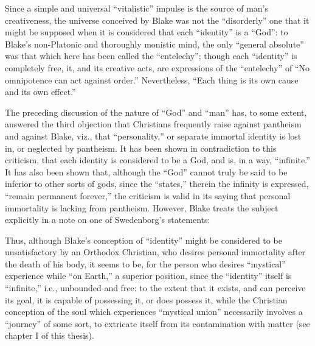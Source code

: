 Since a simple and universal \enquote{vitalistic} impulse is the source of man's creativeness,
the universe conceived by Blake was not the \enquote{disorderly} one that it might be supposed when it is considered that each \enquote{identity} is a \enquote{God}: to
Blake's non-Platonic and thoroughly monistic mind, the only \enquote{general absolute} was that which here has been called the \enquote{entelechy}; though each \enquote{identity}
is completely free, it, and its creative acts, are expressions of the \enquote{entelechy} of
\enquote{No omnipotence can act against order.}\supercite{keynes:william-blake}
Nevertheless, \enquote{Each thing is its own cause and its own effect.}\supercite{keynes:william-blake}

The preceding discussion of the nature of \enquote{God} and \enquote{man} has, to some extent, answered the third objection that
Christians frequently raise against pantheism and against Blake, viz., that \enquote{personality,} or separate immortal identity
is lost in, or neglected by pantheism. It has been shown in contradiction to this criticism, that each identity is
considered to be a God, and is, in a way, \enquote{infinite.} It has also been shown that, although the \enquote{God} cannot truly be
said to be inferior to other sorts of gods, since the \enquote{states,} therein the infinity is expressed, \enquote{remain permanent forever,}
the criticism is valid in its saying that personal immortality is lacking from pantheism. However, Blake treats the subject
explicitly in a note on one of Swedenborg's statements:\supercite{keynes:william-blake}

\label{self:14}




Thus, although Blake's conception of \enquote{identity} might be considered to be unsatisfactory
by an Orthodox Christian, who desires personal immortality after the death of his body, it seems to be, for
the person who desires \enquote{mystical} experience while \enquote{on Earth,} a superior position, since the \enquote{identity} itself
is \enquote{infinite,} i.e., unbounded and free: to the extent that it exists, and can perceive its goal, it is
capable of possessing it, or does possess it, while the
Christian conception of the soul which experiences \enquote{mystical union} necessarily involves a \enquote{journey} of some sort, to
extricate itself from its contamination with matter (see chapter I of this thesis).

